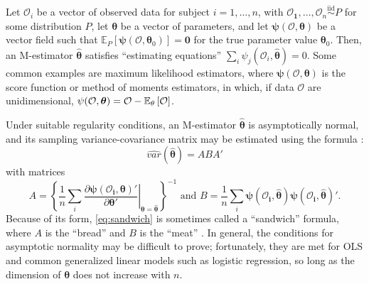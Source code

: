 \documentclass[]{article}
\begin{document}
Let $\bm{\mathcal{O}}_i$ be a vector of observed data for subject $i=1,\dots,n$, with $\bm{\mathcal{O}_1},\dots,\bm{\mathcal{O}}_n\overset{\mathrm{iid}}{\sim} P$ for some distribution $P$, %
let $\bm{\theta}$ be a vector of parameters, 
and let $\bm{\psi}(\bm{\mathcal{O}},\bm{\theta})$ be a vector field such that $\mathbb{E}_P[\bm{\psi}(\bm{\mathcal{O}},\bm{\theta}_0)]=\bm{0}$ for the true parameter value $\bm{\theta}_0$. 
Then, an M-estimator $\bm{\hat{\theta}}$ satisfies ``estimating equations'' $\sum_i \psi_j\left(\bm{\mathcal{O}}_i,\bm{\hat{\theta}}\right)=0$. 
Some common examples are maximum likelihood estimators, where $\bm{\psi}(\bm{\mathcal{O}},\bm{\theta})$ is the score function %
or method of moments estimators, in which, if data $\mathcal{O}$ are unidimensional, $\psi(\mathcal{O},\bm{\theta})=\mathcal{O}-\mathbb{E}_\theta\left[\mathcal{O}\right]$.

Under suitable regularity conditions, an M-estimator $\bm{\hat{\theta}}$ is asymptotically normal, and its sampling variance-covariance matrix may be estimated using the formula \citep[][ch. 7]{boosStefanskiBook}:
\begin{equation}\label{eq:sandwich}
  \widehat{var}(\bm{\hat{\theta}})=ABA'
\end{equation}
with matrices
\begin{equation*}
    A=\left\{\frac{1}{n}\displaystyle\sum_i\left. \frac{\partial \bm{\psi}(\bm{\mathcal{O}_i},\bm{\theta})'}{\partial \bm{\theta}'}\right|_{\bm{\theta}=\bm{\hat{\theta}}}\right\}^{-1}\mbox{ and }B=\frac{1}{n}\sum_i \bm{\psi}(\bm{\mathcal{O}_i},\bm{\hat\theta})\bm{\psi}(\bm{\mathcal{O}_i},\bm{\hat\theta})'.
\end{equation*}
Because of its form, \eqref{eq:sandwich} is sometimes called a ``sandwich'' formula, where $A$ is the ``bread'' and $B$ is the ``meat'' \citep[e.g.][]{sandwich}. 
In general, the conditions for asymptotic normality may be difficult to prove; fortunately, they are met for OLS and common generalized linear models such as logistic regression, so long as the dimension of $\bm{\theta}$ does not increase with $n$.
\end{document}
